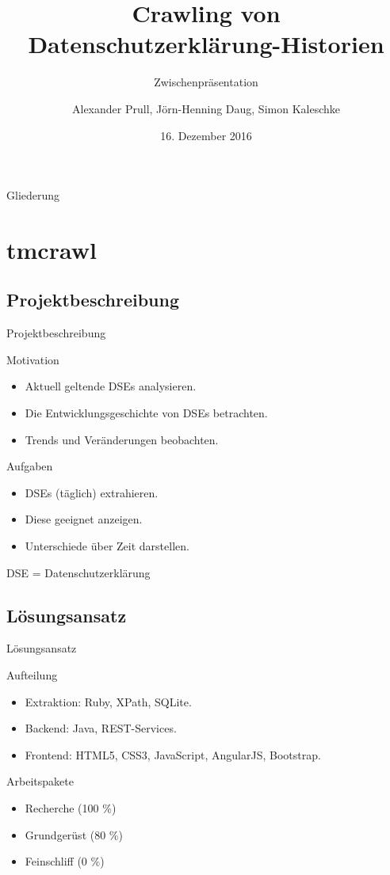\documentclass[halfparskip]{beamer}
\title{Crawling von Datenschutzerklärung-Historien}
\subtitle{Zwischenpräsentation}
\author[AP, JHD, SK]{Alexander Prull, Jörn-Henning Daug, Simon Kaleschke}
\institute{Universität Leipzig}
\date[16. 12. 2016]{16. Dezember 2016}
\begin{document}
\begin{frame}
  \titlepage
\end{frame}

\begin{frame}{Gliederung}
  \tableofcontents
\end{frame}

\section{tmcrawl}
\subsection{Projektbeschreibung}
\begin{frame}{Projektbeschreibung}
	\begin{block}{Motivation}
	\begin{itemize}[label=$\bullet$]
	\item Aktuell geltende DSEs analysieren.
	\item Die Entwicklungsgeschichte von DSEs betrachten.
	\item Trends und Veränderungen beobachten.
	\end{itemize}
	\end{block}
	\begin{block}{Aufgaben}
		\begin{itemize}[label=$\bullet$]
			\item DSEs (täglich) extrahieren.
			\item Diese geeignet anzeigen.
			\item Unterschiede über Zeit darstellen.
		\end{itemize}
	\end{block}
	{\tiny DSE = Datenschutzerklärung}
\end{frame}

\subsection{Lösungsansatz}
\begin{frame}{Lösungsansatz}
	\begin{block}{Aufteilung}
		\begin{itemize}[label=$\bullet$]
			\item Extraktion: Ruby, XPath, SQLite.
			\item Backend: Java, REST-Services.
			\item Frontend: HTML5, CSS3, JavaScript, AngularJS, Bootstrap.
		\end{itemize}
	\end{block}
	\begin{block}{Arbeitspakete}
		\begin{itemize}[label=$\bullet$]
			\item Recherche (100 \%)
			\item Grundgerüst (80 \%)
			\item Feinschliff (0 \%)
		\end{itemize}
	\end{block}
\end{frame}
\end{document}
